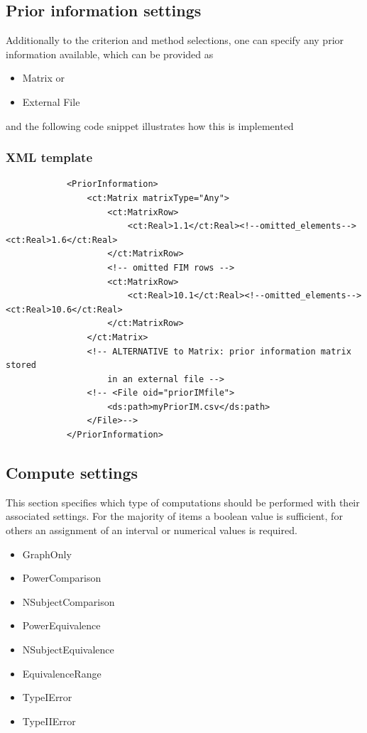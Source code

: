 \subsection{Prior information settings}
Additionally to the criterion and method selections, one can specify any prior information
available, which can be provided as
\begin{itemize}
\item 
Matrix or
\item 
External File
\end{itemize}
and the following code snippet illustrates how this is implemented
\subsubsection{XML template}
\lstset{language=XML}
\begin{lstlisting}
            <PriorInformation>
                <ct:Matrix matrixType="Any">
                    <ct:MatrixRow>
                        <ct:Real>1.1</ct:Real><!--omitted_elements--><ct:Real>1.6</ct:Real>
                    </ct:MatrixRow>
                    <!-- omitted FIM rows -->
                    <ct:MatrixRow>
                        <ct:Real>10.1</ct:Real><!--omitted_elements--><ct:Real>10.6</ct:Real>
                    </ct:MatrixRow>
                </ct:Matrix>
                <!-- ALTERNATIVE to Matrix: prior information matrix stored 
                    in an external file -->
                <!-- <File oid="priorIMfile">
                    <ds:path>myPriorIM.csv</ds:path>
                </File>-->
            </PriorInformation>
\end{lstlisting}


\subsection{Compute settings}
This section specifies which type of computations should be performed with their 
associated settings. For the majority of items a boolean value is sufficient, for others
an assignment of an interval or numerical values is required. 
\begin{itemize}
\item 
GraphOnly
\item 
PowerComparison
\item 
NSubjectComparison
\item 
PowerEquivalence
\item 
NSubjectEquivalence
\item 
EquivalenceRange
\item 
TypeIError
\item 
TypeIIError
\end{itemize}

